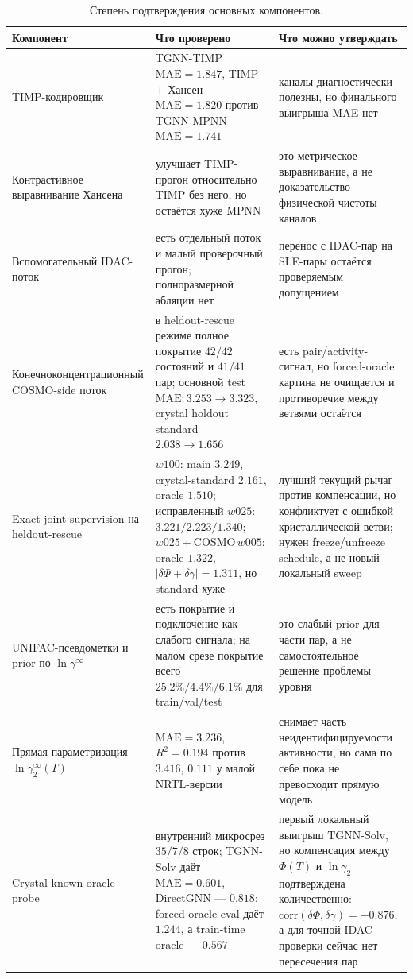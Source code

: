 \documentclass[11pt]{article}
\newcommand{\mae}{\mathrm{MAE}}
\newcommand{\Rtwo}{R^2}
\newcommand{\abs}[1]{\left\lvert #1 \right\rvert}
\theoremstyle{definition}
\begin{document}
\begin{table}[!htbp]
\centering
\caption{Степень подтверждения основных компонентов.}
\label{tab:app-ablation-status}
\footnotesize
\begin{tabularx}{\textwidth}{P{0.25\textwidth}P{0.24\textwidth}Y}
\toprule
Компонент & Что проверено & Что можно утверждать \\
\midrule
TIMP-кодировщик & TGNN-TIMP $\mae=1.847$, TIMP + Хансен $\mae=1.820$ против TGNN-MPNN $\mae=1.741$ & каналы диагностически полезны, но финального выигрыша MAE нет \\
Контрастивное выравнивание Хансена & улучшает TIMP-прогон относительно TIMP без него, но остаётся хуже MPNN & это метрическое выравнивание, а не доказательство физической чистоты каналов \\
Вспомогательный IDAC-поток & есть отдельный поток и малый проверочный прогон; полноразмерной абляции нет & перенос с IDAC-пар на SLE-пары остаётся проверяемым допущением \\
Конечноконцентрационный COSMO-side поток & в heldout-rescue режиме полное покрытие \(42/42\) состояний и \(41/41\) пар; основной test \(\mae: 3.253\to3.323\), crystal holdout standard \(2.038\to1.656\) & есть pair/activity-сигнал, но forced-oracle картина не очищается и противоречие между ветвями остаётся \\
Exact-joint supervision на heldout-rescue & \(w100\): main \(3.249\), crystal-standard \(2.161\), oracle \(1.510\); исправленный \(w025\): \(3.221/2.223/1.340\); \(w025+\mathrm{COSMO}\,w005\): oracle \(1.322\), \(\abs{\delta\Phi+\delta\gamma}=1.311\), но standard хуже & лучший текущий рычаг против компенсации, но конфликтует с ошибкой кристаллической ветви; нужен freeze/unfreeze schedule, а не новый локальный sweep \\
UNIFAC-псевдометки и prior по \(\ln\gamma^\infty\) & есть покрытие и подключение как слабого сигнала; на малом срезе покрытие всего \(25.2\%/4.4\%/6.1\%\) для train/val/test & это слабый prior для части пар, а не самостоятельное решение проблемы уровня \\
Прямая параметризация \(\ln\gamma_2^\infty(T)\) & \(\mae=3.236\), \(\Rtwo=0.194\) против \(3.416\), \(0.111\) у малой NRTL-версии & снимает часть неидентифицируемости активности, но сама по себе пока не превосходит прямую модель \\
Crystal-known oracle probe & внутренний микросрез $35/7/8$ строк; TGNN-Solv даёт \(\mae=0.601\), DirectGNN --- \(0.818\); forced-oracle eval даёт \(1.244\), а train-time oracle --- \(0.567\) & первый локальный выигрыш TGNN-Solv, но компенсация между \(\Phi(T)\) и \(\ln\gamma_2\) подтверждена количественно: \(\mathrm{corr}(\delta\Phi,\delta\gamma)=-0.876\), а для точной IDAC-проверки сейчас нет пересечения пар \\

\end{tabularx}
\end{table}
\end{document}
